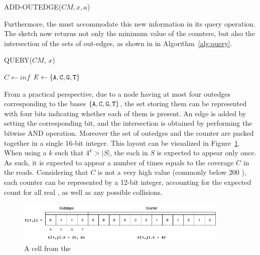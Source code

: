 \begin{algorithm}[htbp]
    \caption{ADD-OUTEDGE($CM, x, a$)}\label{alg:addOutEdge}
\end{algorithm}

Furthermore, the \dBCM must accommodate this new information in its query operation. The sketch now returns not only the minimum value of the counters, but also the intersection of the sets of out-edges, as shown in in Algorithm~\ref{alg:query}.

\begin{algorithm}
	\caption{QUERY($CM$, $x$)}\label{alg:query}
	$C \gets \mathit{inf}$\;
	$E \gets \{\mathtt{A}, \mathtt{C}, \mathtt{G}, \mathtt{T}\}$\;
\end{algorithm}

From a practical perspective, due to a node having at most four outedges corresponding to the bases $\{\mathtt{A}, \mathtt{C}, \mathtt{G}, \mathtt{T}\}$, the set storing them can be represented with four bits indicating whether each of them is present. An edge is added by setting the corresponding bit, and the intersection is obtained by performing the bitwise AND operation. Moreover the set of outedges and the counter are packed together in a single 16-bit integer. This layout can be visualized in Figure~\ref{fig:dbcm-bit_use}. When using a $k$ such that $4^k > |S|$, the each \kmer in $S$ is expected to appear only once. As such, it is expected to appear a number of times equals to the coverage $C$ in the reads. Considering that $C$ is not a very high value (commonly below $200$ ), each counter can be represented by a 12-bit integer, accounting for the expected count for all real , as well as any possible collisions.

\begin{figure}[htbp]
  \centering
  \includegraphics[width=0.9\textwidth]{figures/dbcm-bit_use}
  \caption{A cell from the \dBCM}\label{fig:dbcm-bit_use}
\end{figure}

